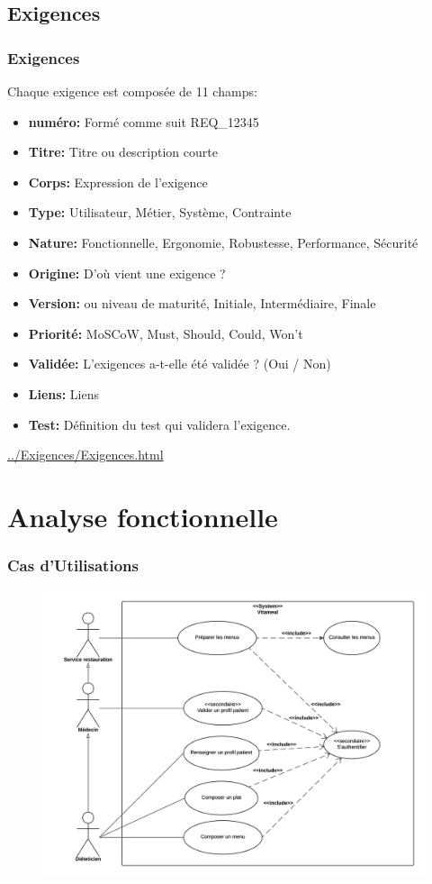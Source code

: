 \documentclass{beamer}
\begin{document}
\subsection{Exigences}
\begin{frame}
 \frametitle{Exigences}
Chaque exigence est composée de 11 champs:
\begin{itemize}
\item \textbf{numéro:} Formé comme suit REQ\_12345
\item \textbf{Titre:} Titre ou description courte
\item \textbf{Corps:} Expression de l'exigence
\item \textbf{Type:} Utilisateur, Métier, Système, Contrainte
\item \textbf{Nature:} Fonctionnelle, Ergonomie, Robustesse, Performance, Sécurité
\item \textbf{Origine:} D'où vient une exigence ?
\item \textbf{Version:} ou niveau de maturité, Initiale, Intermédiaire, Finale
\item \textbf{Priorité:} MoSCoW, Must, Should, Could, Won't
\item \textbf{Validée:} L'exigences a-t-elle été validée ? (Oui / Non)
\item \textbf{Liens:} Liens
\item \textbf{Test:} Définition du test qui validera l'exigence.
\end{itemize}

\url{../Exigences/Exigences.html}
\end{frame}

\section{Analyse fonctionnelle}

\begin{frame}
\frametitle{Cas d'Utilisations}
\begin{figure}[H]
\label{schema}
  \centering
      \includegraphics[scale=0.4]{../CasDUtilisations/diagramme_cas_utilisation.png}
\end{figure}
\end{frame}
\end{document}
